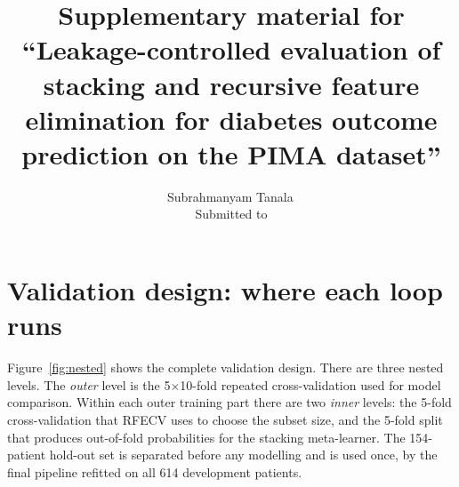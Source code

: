 \documentclass[11pt]{article}
\title{Supplementary material for\\[4pt]\large ``Leakage-controlled evaluation of stacking and recursive feature elimination for diabetes outcome prediction on the PIMA dataset''}
\author{Subrahmanyam Tanala\,\orcidlink{\authororcid}\\[2pt]\small Submitted to \emph{\targetjournal}}
\date{}
\begin{document}
\maketitle

\section{Validation design: where each loop runs}

Figure~\ref{fig:nested} shows the complete validation design. There are three nested levels. The \emph{outer} level is the 5$\times$10-fold repeated cross-validation used for model comparison. Within each outer training part there are two \emph{inner} levels: the 5-fold cross-validation that RFECV uses to choose the subset size, and the 5-fold split that produces out-of-fold probabilities for the stacking meta-learner. The 154-patient hold-out set is separated before any modelling and is used once, by the final pipeline refitted on all 614 development patients.
\end{document}
